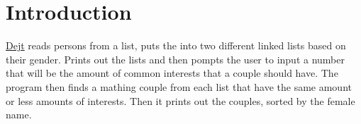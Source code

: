 \hypertarget{index_intro_sec}{}\section{Introduction}\label{index_intro_sec}
\hyperlink{class_dejt}{Dejt} reads persons from a list, puts the into two different linked lists based on their gender. Prints out the lists and then pompts the user to input a number that will be the amount of common interests that a couple should have. The program then finds a mathing couple from each list that have the same amount or less amounts of interests. Then it prints out the couples, sorted by the female name. 